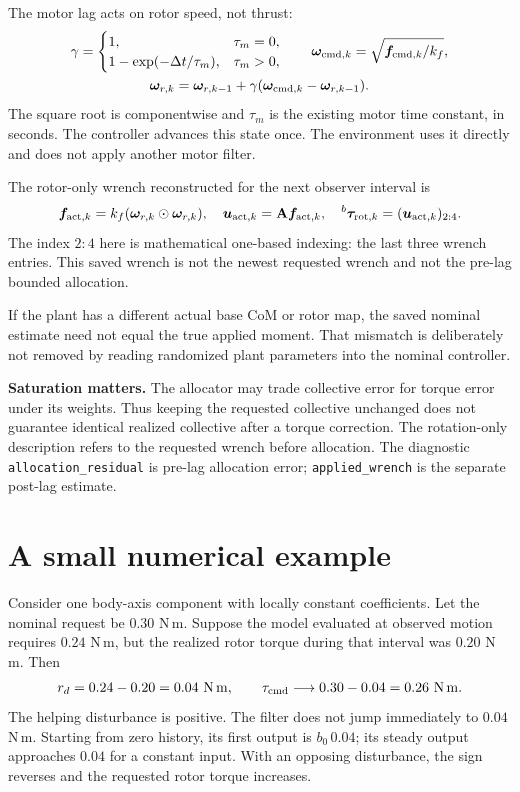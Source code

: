 \documentclass[11pt,a4paper]{article}
\newcommand{\vct}[1]{\boldsymbol{#1}}
\newcommand{\mat}[1]{\mathbf{#1}}
\newcommand{\bv}[1]{{}^{b}\vct{#1}}
\begin{document}
The motor lag acts on rotor speed, not thrust:
\begin{equation}
\begin{gathered}
\gamma=\begin{cases}
1,&\tau_m=0,\\
1-\exp(-\Delta t/\tau_m),&\tau_m>0,
\end{cases}\qquad
\vct\omega_{{\rm cmd},k}=\sqrt{\vct f_{{\rm cmd},k}/k_f},\\
\vct\omega_{r,k}=\vct\omega_{r,k-1}+
\gamma(\vct\omega_{{\rm cmd},k}-\vct\omega_{r,k-1}).
\end{gathered}\label{eq:motor}
\end{equation}
The square root is componentwise and $\tau_m$ is the existing motor time
constant, in seconds. The controller advances this state once. The environment
uses it directly and does not apply another motor filter.

The rotor-only wrench reconstructed for the next observer interval is
\begin{equation}
\vct f_{{\rm act},k}=k_f(\vct\omega_{r,k}\odot\vct\omega_{r,k}),\quad
\vct u_{{\rm act},k}=\mat A\vct f_{{\rm act},k},\quad
\bv\tau_{{\rm rot},k}=(\vct u_{{\rm act},k})_{2:4}.
\label{eq:realized}
\end{equation}
The index $2{:}4$ here is mathematical one-based indexing: the last three wrench
entries. This saved wrench is not the newest requested wrench and not the
pre-lag bounded allocation.

If the plant has a different actual base CoM or rotor map, the saved nominal
estimate need not equal the true applied moment. That mismatch is deliberately
not removed by reading randomized plant parameters into the nominal controller.

\textbf{Saturation matters.} The allocator may trade collective error for torque
error under its weights. Thus keeping the requested collective unchanged does
not guarantee identical realized collective after a torque correction. The
rotation-only description refers to the requested wrench before allocation.
The diagnostic \texttt{allocation\_residual} is pre-lag allocation error;
\texttt{applied\_wrench} is the separate post-lag estimate.

\section{A small numerical example}\label{sec:example}

Consider one body-axis component with locally constant coefficients. Let the
nominal request be $0.30$ N\,m. Suppose the model evaluated at observed motion
requires $0.24$ N\,m, but the realized rotor torque during that interval was
$0.20$ N\,m. Then
\begin{equation}
r_d=0.24-0.20=0.04\ {\rm N\,m},\qquad
\tau_{\rm cmd}\longrightarrow0.30-0.04=0.26\ {\rm N\,m}.
\label{eq:example}
\end{equation}
The helping disturbance is positive. The filter does not jump immediately to
$0.04$ N\,m. Starting from zero history, its first output is $b_0\,0.04$; its
steady output approaches $0.04$ for a constant input. With an opposing
disturbance, the sign reverses and the requested rotor torque increases.
\end{document}
